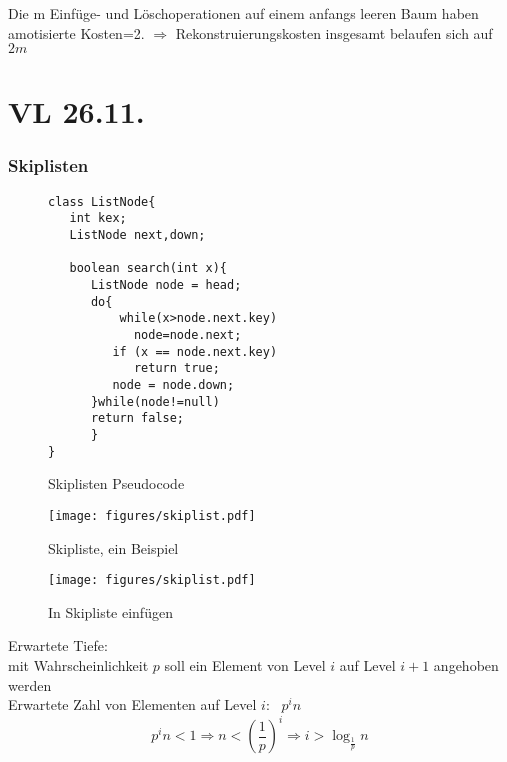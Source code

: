 \documentclass[a4paper,draft,twoside,10pt]{report}
\begin{document}
Die m Einfüge- und Löschoperationen auf einem anfangs leeren Baum haben amotisierte Kosten=2.
$\Rightarrow$ Rekonstruierungskosten insgesamt belaufen sich auf $2m$

\chapter{VL 26.11.}
\subsection{Skiplisten}
\begin{figure}[H]
\begin{verbatim}
class ListNode{
   int kex;
   ListNode next,down;

   boolean search(int x){
      ListNode node = head;
      do{
          while(x>node.next.key)
            node=node.next;
         if (x == node.next.key)
            return true;
         node = node.down; 
      }while(node!=null)
      return false;
      }
}
\end{verbatim}
\caption{Skiplisten Pseudocode}
\end{figure}

\begin{figure}[H]\center
\texttt{[image: figures/skiplist.pdf]}
\caption{Skipliste, ein Beispiel}
\end{figure}

\begin{figure}[H]\center
\texttt{[image: figures/skiplist.pdf]}
\caption{In Skipliste einfügen}
\end{figure}

Erwartete Tiefe:\\
mit Wahrscheinlichkeit $p$ soll ein Element von Level $i$ auf Level $i+1$ angehoben werden\\
Erwartete Zahl von Elementen auf Level $i$: \, $p^in$
\[p^in<1 \Rightarrow n < \left(\frac{1}{p}\right)^i \Rightarrow i>\log_\frac{1}{p}n\]
\end{document}
